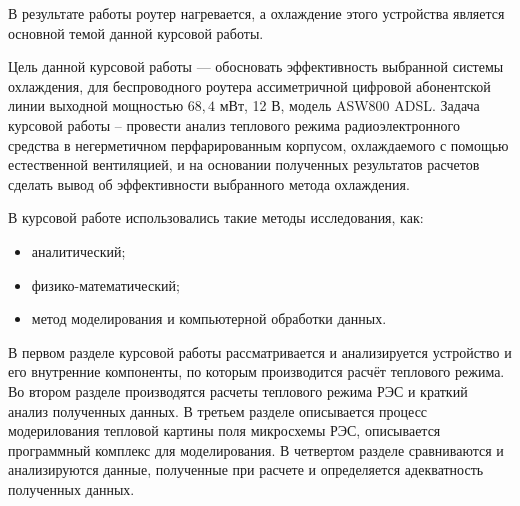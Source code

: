 В результате работы роутер нагревается, а охлаждение этого устройства
является основной темой данной курсовой работы.

Цель данной курсовой работы — обосновать эффективность выбранной
системы охлаждения, для беспроводного роутера ассиметричной цифровой
абонентской линии выходной мощностью
$68,4$ мВт, 12 В, модель ASW800 ADSL.
Задача курсовой работы – провести анализ теплового режима
радиоэлектронного средства в негерметичном перфарированным корпусом,
охлаждаемого с помощью естественной вентиляцией, и на основании
полученных результатов расчетов сделать вывод об эффективности
выбранного метода охлаждения.

В курсовой работе использовались такие методы исследования, как:
\begin{itemize}[nosep]
\item аналитический;
\item физико-математический;
\item метод моделирования и компьютерной обработки данных.  
\end{itemize}

В первом разделе курсовой работы рассматривается и анализируется
устройство и его внутренние компоненты, по которым производится
расчёт теплового режима. Во втором разделе производятся расчеты
теплового режима РЭС и краткий анализ полученных данных.
В третьем разделе описывается процесс модерилования тепловой
картины поля микросхемы РЭС, описывается программный комплекс для моделирования.
В четвертом разделе сравниваются и анализируются данные, полученные при расчете
и определяется адекватность полученных данных.

\newpage
